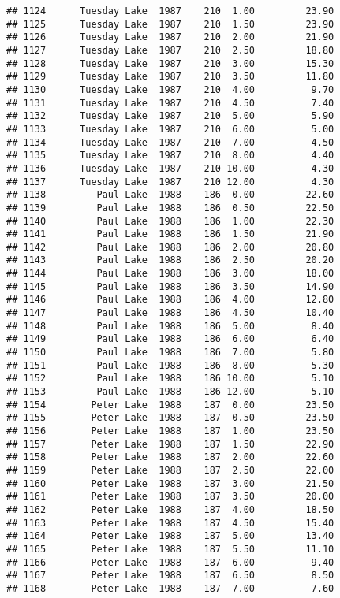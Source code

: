\documentclass[
]{article}
\begin{document}
\begin{verbatim}
## 1124      Tuesday Lake  1987    210  1.00         23.90
## 1125      Tuesday Lake  1987    210  1.50         23.90
## 1126      Tuesday Lake  1987    210  2.00         21.90
## 1127      Tuesday Lake  1987    210  2.50         18.80
## 1128      Tuesday Lake  1987    210  3.00         15.30
## 1129      Tuesday Lake  1987    210  3.50         11.80
## 1130      Tuesday Lake  1987    210  4.00          9.70
## 1131      Tuesday Lake  1987    210  4.50          7.40
## 1132      Tuesday Lake  1987    210  5.00          5.90
## 1133      Tuesday Lake  1987    210  6.00          5.00
## 1134      Tuesday Lake  1987    210  7.00          4.50
## 1135      Tuesday Lake  1987    210  8.00          4.40
## 1136      Tuesday Lake  1987    210 10.00          4.30
## 1137      Tuesday Lake  1987    210 12.00          4.30
## 1138         Paul Lake  1988    186  0.00         22.60
## 1139         Paul Lake  1988    186  0.50         22.50
## 1140         Paul Lake  1988    186  1.00         22.30
## 1141         Paul Lake  1988    186  1.50         21.90
## 1142         Paul Lake  1988    186  2.00         20.80
## 1143         Paul Lake  1988    186  2.50         20.20
## 1144         Paul Lake  1988    186  3.00         18.00
## 1145         Paul Lake  1988    186  3.50         14.90
## 1146         Paul Lake  1988    186  4.00         12.80
## 1147         Paul Lake  1988    186  4.50         10.40
## 1148         Paul Lake  1988    186  5.00          8.40
## 1149         Paul Lake  1988    186  6.00          6.40
## 1150         Paul Lake  1988    186  7.00          5.80
## 1151         Paul Lake  1988    186  8.00          5.30
## 1152         Paul Lake  1988    186 10.00          5.10
## 1153         Paul Lake  1988    186 12.00          5.10
## 1154        Peter Lake  1988    187  0.00         23.50
## 1155        Peter Lake  1988    187  0.50         23.50
## 1156        Peter Lake  1988    187  1.00         23.50
## 1157        Peter Lake  1988    187  1.50         22.90
## 1158        Peter Lake  1988    187  2.00         22.60
## 1159        Peter Lake  1988    187  2.50         22.00
## 1160        Peter Lake  1988    187  3.00         21.50
## 1161        Peter Lake  1988    187  3.50         20.00
## 1162        Peter Lake  1988    187  4.00         18.50
## 1163        Peter Lake  1988    187  4.50         15.40
## 1164        Peter Lake  1988    187  5.00         13.40
## 1165        Peter Lake  1988    187  5.50         11.10
## 1166        Peter Lake  1988    187  6.00          9.40
## 1167        Peter Lake  1988    187  6.50          8.50
## 1168        Peter Lake  1988    187  7.00          7.60

\end{verbatim}
\end{document}
